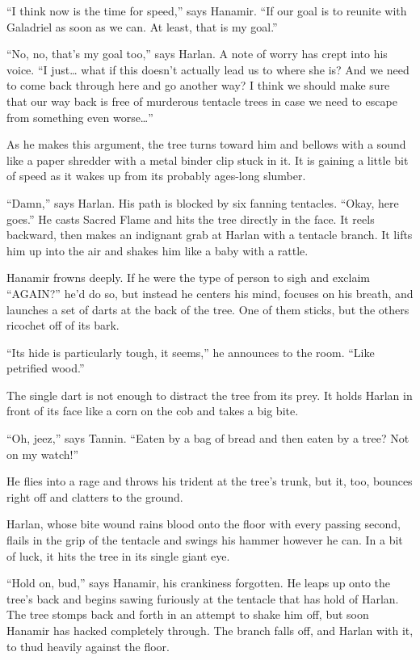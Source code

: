 \documentclass[smalldemyvopaper,11pt,twoside,onecolumn,openright,extrafontsizes]{memoir}
\begin{document}
``I think now is the time for speed,'' says Hanamir. ``If our goal is to
reunite with Galadriel as soon as we can. At least, that is my goal.''

``No, no, that's my goal too,'' says Harlan. A note of worry has crept
into his voice. ``I just\ldots{} what if this doesn't actually lead us
to where she is? And we need to come back through here and go another
way? I think we should make sure that our way back is free of murderous
tentacle trees in case we need to escape from something even
worse\ldots{}''

As he makes this argument, the tree turns toward him and bellows with a
sound like a paper shredder with a metal binder clip stuck in it. It is
gaining a little bit of speed as it wakes up from its probably ages-long
slumber.

``Damn,'' says Harlan. His path is blocked by six fanning tentacles.
``Okay, here goes.'' He casts Sacred Flame and hits the tree directly in
the face. It reels backward, then makes an indignant grab at Harlan with
a tentacle branch. It lifts him up into the air and shakes him like a
baby with a rattle.

Hanamir frowns deeply. If he were the type of person to sigh and exclaim
``AGAIN?'' he'd do so, but instead he centers his mind, focuses on his
breath, and launches a set of darts at the back of the tree. One of them
sticks, but the others ricochet off of its bark.

``Its hide is particularly tough, it seems,'' he announces to the room.
``Like petrified wood.''

The single dart is not enough to distract the tree from its prey. It
holds Harlan in front of its face like a corn on the cob and takes a big
bite.

``Oh, jeez,'' says Tannin. ``Eaten by a bag of bread and then eaten by a
tree? Not on my watch!''

He flies into a rage and throws his trident at the tree's trunk, but it,
too, bounces right off and clatters to the ground.

Harlan, whose bite wound rains blood onto the floor with every passing
second, flails in the grip of the tentacle and swings his hammer however
he can. In a bit of luck, it hits the tree in its single giant eye.

``Hold on, bud,'' says Hanamir, his crankiness forgotten. He leaps up
onto the tree's back and begins sawing furiously at the tentacle that
has hold of Harlan. The tree stomps back and forth in an attempt to
shake him off, but soon Hanamir has hacked completely through. The
branch falls off, and Harlan with it, to thud heavily against the floor.
\end{document}
